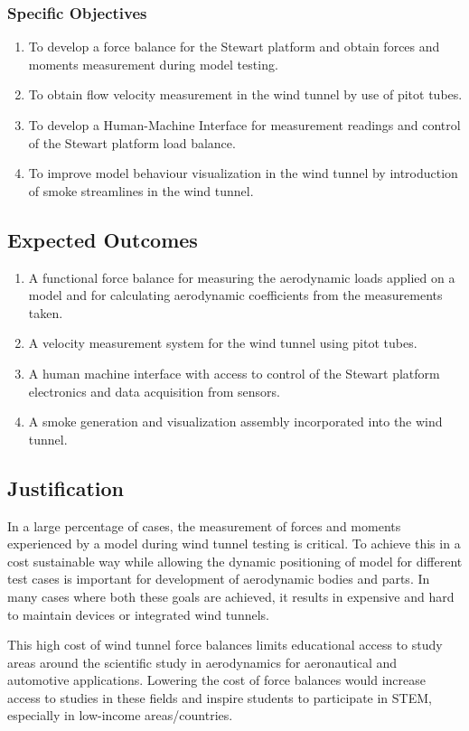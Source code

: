 \subsubsection{Specific Objectives}
\begin{enumerate}
    \item To develop a force balance for the Stewart platform and obtain forces and moments measurement during model testing.
    \item To obtain flow velocity measurement in the wind tunnel by use of pitot tubes.
    \item To develop a Human-Machine Interface for measurement readings and control of the Stewart platform load balance.
    \item To improve model behaviour visualization in the wind tunnel by introduction of smoke streamlines in the wind tunnel.
\end{enumerate}
\subsection{Expected Outcomes}
\begin{enumerate}
    \item A functional force balance for measuring the aerodynamic loads applied on a model and for calculating aerodynamic coefficients from the measurements taken.
    \item A velocity measurement system for the wind tunnel using pitot tubes.
    \item A human machine interface with access to control of the Stewart platform electronics and data acquisition from sensors.
    \item A smoke generation and visualization assembly incorporated into the wind tunnel.
\end{enumerate}

\subsection{Justification}
In a large percentage of cases, the measurement of forces and moments experienced by
a model during wind tunnel testing is critical. To achieve this in a cost sustainable way
while allowing the dynamic positioning of model for different test cases is important for
development of aerodynamic bodies and parts. In many cases where both these goals are
achieved, it results in expensive and hard to maintain devices or integrated wind tunnels.

This high cost of wind tunnel force balances limits educational access to study areas around
 the scientific study in aerodynamics for aeronautical and automotive applications. Lowering 
the cost of force balances would increase access to studies in these fields and inspire
 students to participate in STEM, especially in low-income areas/countries.